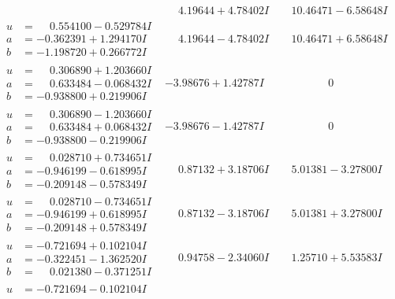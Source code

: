 \documentclass[1p]{elsarticle_modified}
\theoremstyle{definition}
\begin{document}
$$\begin{array}{c|c|c}
 & \phantom{-}4.19644 + 4.78402 I & \phantom{-}10.46471 - 6.58648 I \\ \hline\begin{aligned}
u &= \phantom{-}0.554100 - 0.529784 I \\
a &= -0.362391 + 1.294170 I \\
b &= -1.198720 + 0.266772 I\end{aligned}
 & \phantom{-}4.19644 - 4.78402 I & \phantom{-}10.46471 + 6.58648 I \\ \hline\begin{aligned}
u &= \phantom{-}0.306890 + 1.203660 I \\
a &= \phantom{-}0.633484 - 0.068432 I \\
b &= -0.938800 + 0.219906 I\end{aligned}
 & -3.98676 + 1.42787 I & \phantom{-0.000000 } 0 \\ \hline\begin{aligned}
u &= \phantom{-}0.306890 - 1.203660 I \\
a &= \phantom{-}0.633484 + 0.068432 I \\
b &= -0.938800 - 0.219906 I\end{aligned}
 & -3.98676 - 1.42787 I & \phantom{-0.000000 } 0 \\ \hline\begin{aligned}
u &= \phantom{-}0.028710 + 0.734651 I \\
a &= -0.946199 - 0.618995 I \\
b &= -0.209148 - 0.578349 I\end{aligned}
 & \phantom{-}0.87132 + 3.18706 I & \phantom{-}5.01381 - 3.27800 I \\ \hline\begin{aligned}
u &= \phantom{-}0.028710 - 0.734651 I \\
a &= -0.946199 + 0.618995 I \\
b &= -0.209148 + 0.578349 I\end{aligned}
 & \phantom{-}0.87132 - 3.18706 I & \phantom{-}5.01381 + 3.27800 I \\ \hline\begin{aligned}
u &= -0.721694 + 0.102104 I \\
a &= -0.322451 - 1.362520 I \\
b &= \phantom{-}0.021380 - 0.371251 I\end{aligned}
 & \phantom{-}0.94758 - 2.34060 I & \phantom{-}1.25710 + 5.53583 I \\ \hline\begin{aligned}
u &= -0.721694 - 0.102104 I \\

\end{aligned}
\end{array}$$
\end{document}
